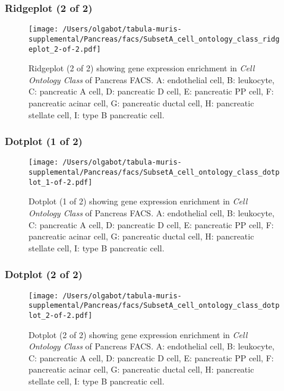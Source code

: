\clearpage

\subsubsection{Ridgeplot (2 of 2)}
\begin{figure}[h]
\centering
\texttt{[image: /Users/olgabot/tabula-muris-supplemental/Pancreas/facs/SubsetA\_cell\_ontology\_class\_ridgeplot\_2-of-2.pdf]}

\caption{ Ridgeplot (2 of 2)  showing gene expression enrichment in \emph{Cell Ontology Class} of Pancreas FACS. A: endothelial cell, B: leukocyte, C: pancreatic A cell, D: pancreatic D cell, E: pancreatic PP cell, F: pancreatic acinar cell, G: pancreatic ductal cell, H: pancreatic stellate cell, I: type B pancreatic cell.}
\end{figure}


\clearpage

\subsubsection{Dotplot (1 of 2)}
\begin{figure}[h]
\centering
\texttt{[image: /Users/olgabot/tabula-muris-supplemental/Pancreas/facs/SubsetA\_cell\_ontology\_class\_dotplot\_1-of-2.pdf]}

\caption{ Dotplot (1 of 2)  showing gene expression enrichment in \emph{Cell Ontology Class} of Pancreas FACS. A: endothelial cell, B: leukocyte, C: pancreatic A cell, D: pancreatic D cell, E: pancreatic PP cell, F: pancreatic acinar cell, G: pancreatic ductal cell, H: pancreatic stellate cell, I: type B pancreatic cell.}
\end{figure}


\clearpage

\subsubsection{Dotplot (2 of 2)}
\begin{figure}[h]
\centering
\texttt{[image: /Users/olgabot/tabula-muris-supplemental/Pancreas/facs/SubsetA\_cell\_ontology\_class\_dotplot\_2-of-2.pdf]}

\caption{ Dotplot (2 of 2)  showing gene expression enrichment in \emph{Cell Ontology Class} of Pancreas FACS. A: endothelial cell, B: leukocyte, C: pancreatic A cell, D: pancreatic D cell, E: pancreatic PP cell, F: pancreatic acinar cell, G: pancreatic ductal cell, H: pancreatic stellate cell, I: type B pancreatic cell.}
\end{figure}



